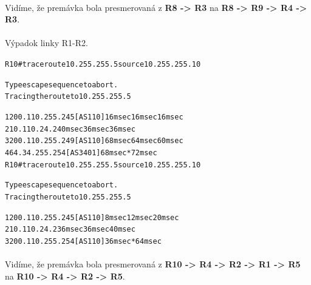\documentclass[12pt,twoside,a4paper]{report}
\begin{document}
\paragraph{}
Vidíme, že premávka bola presmerovaná z \textbf{R8 -\textgreater{} R3} na \textbf{R8 -\textgreater{} R9 -\textgreater{} R4 -\textgreater{} R3}.

\paragraph{}
Výpadok linky R1-R2.

\noindent
{\selectfont
\begin{small}
\begin{alltt}
R10#traceroute 10.255.255.5 source 10.255.255.10

Type escape sequence to abort.
Tracing the route to 10.255.255.5

  1 200.110.255.245 [AS 110] 16 msec 16 msec 16 msec
  2 10.110.24.2 40 msec 36 msec 36 msec
  3 200.110.255.249 [AS 110] 68 msec 64 msec 60 msec
  4 64.34.255.254 [AS 3401] 68 msec *  72 msec
R10#traceroute 10.255.255.5 source 10.255.255.10

Type escape sequence to abort.
Tracing the route to 10.255.255.5

  1 200.110.255.245 [AS 110] 8 msec 12 msec 20 msec
  2 10.110.24.2 36 msec 36 msec 40 msec
  3 200.110.255.254 [AS 110] 36 msec *  64 msec
\end{alltt}
\end{small}
}

\paragraph{}
Vidíme, že premávka bola presmerovaná z \textbf{R10 -\textgreater{} R4 -\textgreater{} R2 -\textgreater{} R1 -\textgreater{} R5} na \textbf{R10 -\textgreater{} R4 -\textgreater{} R2 -\textgreater{} R5}.
\end{document}
